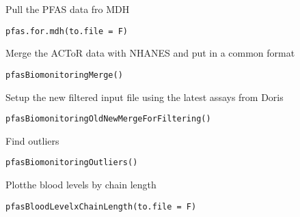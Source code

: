 \documentclass[letterpaper]{book}
\begin{document}
%
\begin{Description}\relax
Pull the PFAS data fro MDH
\end{Description}
%
\begin{Usage}
\begin{verbatim}
pfas.for.mdh(to.file = F)
\end{verbatim}
\end{Usage}
%
\begin{Description}\relax
Merge the ACToR data with NHANES and put in a common format
\end{Description}
%
\begin{Usage}
\begin{verbatim}
pfasBiomonitoringMerge()
\end{verbatim}
\end{Usage}
%
\begin{Description}\relax
Setup the new filtered input file using the latest assays from Doris
\end{Description}
%
\begin{Usage}
\begin{verbatim}
pfasBiomonitoringOldNewMergeForFiltering()
\end{verbatim}
\end{Usage}
%
\begin{Description}\relax
Find outliers
\end{Description}
%
\begin{Usage}
\begin{verbatim}
pfasBiomonitoringOutliers()
\end{verbatim}
\end{Usage}
%
\begin{Description}\relax
Plotthe blood levels by chain length
\end{Description}
%
\begin{Usage}
\begin{verbatim}
pfasBloodLevelxChainLength(to.file = F)
\end{verbatim}
\end{Usage}
\end{document}
